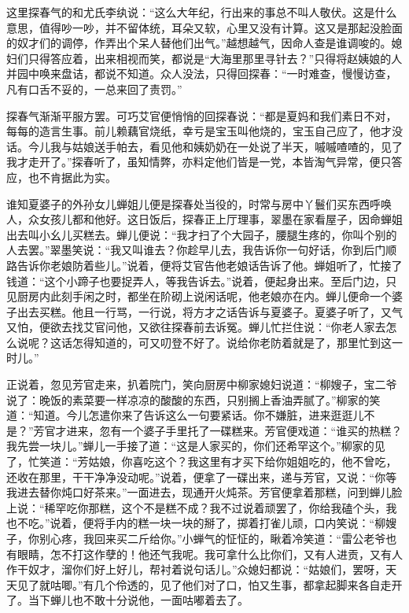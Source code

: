 这里探春气的和尤氏李纨说：``这么大年纪，行出来的事总不叫人敬伏。这是什么意思，值得吵一吵，并不留体统，耳朵又软，心里又没有计算。这又是那起没脸面的奴才们的调停，作弄出个呆人替他们出气。''越想越气，因命人查是谁调唆的。媳妇们只得答应着，出来相视而笑，都说是``大海里那里寻针去？''只得将赵姨娘的人并园中唤来盘诘，都说不知道。众人没法，只得回探春：``一时难查，慢慢访查，凡有口舌不妥的，一总来回了责罚。''

探春气渐渐平服方罢。可巧艾官便悄悄的回探春说：``都是夏妈和我们素日不对，每每的造言生事。前儿赖藕官烧纸，幸亏是宝玉叫他烧的，宝玉自己应了，他才没话。今儿我与姑娘送手帕去，看见他和姨奶奶在一处说了半天，嘁嘁喳喳的，见了我才走开了。''探春听了，虽知情弊，亦料定他们皆是一党，本皆淘气异常，便只答应，也不肯据此为实。

谁知夏婆子的外孙女儿蝉姐儿便是探春处当役的，时常与房中丫鬟们买东西呼唤人，众女孩儿都和他好。这日饭后，探春正上厅理事，翠墨在家看屋子，因命蝉姐出去叫小幺儿买糕去。蝉儿便说：``我才扫了个大园子，腰腿生疼的，你叫个别的人去罢。''翠墨笑说：``我又叫谁去？你趁早儿去，我告诉你一句好话，你到后门顺路告诉你老娘防着些儿。''说着，便将艾官告他老娘话告诉了他。蝉姐听了，忙接了钱道：``这个小蹄子也要捉弄人，等我告诉去。''说着，便起身出来。至后门边，只见厨房内此刻手闲之时，都坐在阶砌上说闲话呢，他老娘亦在内。蝉儿便命一个婆子出去买糕。他且一行骂，一行说，将方才之话告诉与夏婆子。夏婆子听了，又气又怕，便欲去找艾官问他，又欲往探春前去诉冤。蝉儿忙拦住说：``你老人家去怎么说呢？这话怎得知道的，可又叨登不好了。说给你老防着就是了，那里忙到这一时儿。''

正说着，忽见芳官走来，扒着院门，笑向厨房中柳家媳妇说道：``柳嫂子，宝二爷说了：晚饭的素菜要一样凉凉的酸酸的东西，只别搁上香油弄腻了。''柳家的笑道：``知道。今儿怎遣你来了告诉这么一句要紧话。你不嫌脏，进来逛逛儿不是？''芳官才进来，忽有一个婆子手里托了一碟糕来。芳官便戏道：``谁买的热糕？我先尝一块儿。''蝉儿一手接了道：``这是人家买的，你们还希罕这个。''柳家的见了，忙笑道：``芳姑娘，你喜吃这个？我这里有才买下给你姐姐吃的，他不曾吃，还收在那里，干干净净没动呢。''说着，便拿了一碟出来，递与芳官，又说：``你等我进去替你炖口好茶来。''一面进去，现通开火炖茶。芳官便拿着那糕，问到蝉儿脸上说：``稀罕吃你那糕，这个不是糕不成？我不过说着顽罢了，你给我磕个头，我也不吃。''说着，便将手内的糕一块一块的掰了，掷着打雀儿顽，口内笑说：``柳嫂子，你别心疼，我回来买二斤给你。''小蝉气的怔怔的，瞅着冷笑道：``雷公老爷也有眼睛，怎不打这作孽的！他还气我呢。我可拿什么比你们，又有人进贡，又有人作干奴才，溜你们好上好儿，帮衬着说句话儿。''众媳妇都说：``姑娘们，罢呀，天天见了就咕唧。''有几个伶透的，见了他们对了口，怕又生事，都拿起脚来各自走开了。当下蝉儿也不敢十分说他，一面咕嘟着去了。

